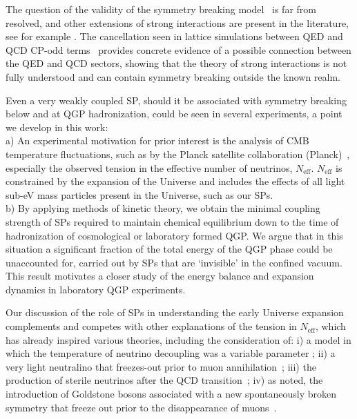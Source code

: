 The question of the validity of the symmetry breaking model~\cite{Anchordoqui:2011nh}  is far from resolved, and other extensions of strong interactions   are present in the literature, see for example \cite{Georgi:1989gp}. The cancellation seen in lattice simulations between QED and QCD CP-odd terms~\cite{Bonati:2013hsa,D'Elia:2012zw}  provides concrete evidence of a possible connection between the QED and QCD sectors, showing that the theory of strong interactions is not fully understood and can contain symmetry breaking outside the known realm.

Even a very weakly coupled SP, should it be associated with symmetry breaking below and at QGP hadronization, could be seen in several experiments, a point we develop in this work:\\
a)  An experimental motivation for prior interest is the analysis of CMB temperature fluctuations, such as by the Planck satellite collaboration (Planck)~\cite{Planck}, especially the observed tension in the effective number of neutrinos, $N_{\text{eff}}$. $N_{\text{eff}}$ is constrained by the expansion of the Universe and includes the effects of all light sub-eV mass particles present in the Universe, such as our SPs.\\
b)   By applying methods of kinetic theory, we obtain the minimal coupling strength of SPs required to maintain chemical equilibrium down to the time of  hadronization of cosmological or laboratory formed QGP.  We argue that in this situation a significant fraction of the total energy of the QGP phase could be unaccounted for, carried out by SPs  that are `invisible'  in the confined vacuum.  This result motivates a closer study of the energy balance and expansion dynamics in laboratory QGP experiments.

Our discussion of the role of SPs in understanding the early Universe expansion complements and competes with other explanations of the tension in  $N_{\text{eff}}$, which has already inspired various theories, including the consideration of:
i)  a model in which the temperature of neutrino decoupling was a variable parameter \cite{Birrell:2013_2};
ii) a very light neutralino that freezes-out prior to muon annihilation~\cite{Dreiner:2011fp};
iii) the production of sterile neutrinos after the QCD transition~\cite{Lello:2014yha};
iv) as noted, the introduction of Goldstone bosons associated with a new spontaneously broken symmetry that freeze out prior to the disappearance of muons~\cite{Weinberg:2013kea}. 
 
